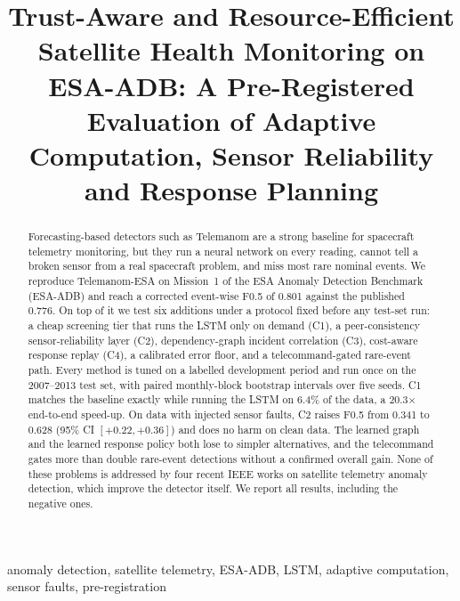 \documentclass[conference]{IEEEtran}
\begin{document}
\title{Trust-Aware and Resource-Efficient Satellite Health Monitoring on ESA-ADB: A Pre-Registered Evaluation of Adaptive Computation, Sensor Reliability and Response Planning}

\author{
}

\maketitle

\begin{abstract}
Forecasting-based detectors such as Telemanom are a strong baseline for spacecraft telemetry monitoring, but they run a neural network on every reading, cannot tell a broken sensor from a real spacecraft problem, and miss most rare nominal events. We reproduce Telemanom-ESA on Mission~1 of the ESA Anomaly Detection Benchmark (ESA-ADB) and reach a corrected event-wise F0.5 of 0.801 against the published 0.776. On top of it we test six additions under a protocol fixed before any test-set run: a cheap screening tier that runs the LSTM only on demand (C1), a peer-consistency sensor-reliability layer (C2), dependency-graph incident correlation (C3), cost-aware response replay (C4), a calibrated error floor, and a telecommand-gated rare-event path. Every method is tuned on a labelled development period and run once on the 2007--2013 test set, with paired monthly-block bootstrap intervals over five seeds. C1 matches the baseline exactly while running the LSTM on 6.4\% of the data, a 20.3$\times$ end-to-end speed-up. On data with injected sensor faults, C2 raises F0.5 from 0.341 to 0.628 (95\% CI $[+0.22, +0.36]$) and does no harm on clean data. The learned graph and the learned response policy both lose to simpler alternatives, and the telecommand gates more than double rare-event detections without a confirmed overall gain. None of these problems is addressed by four recent IEEE works on satellite telemetry anomaly detection, which improve the detector itself. We report all results, including the negative ones.
\end{abstract}

\begin{IEEEkeywords}
anomaly detection, satellite telemetry, ESA-ADB, LSTM, adaptive computation, sensor faults, pre-registration
\end{IEEEkeywords}
\end{document}
